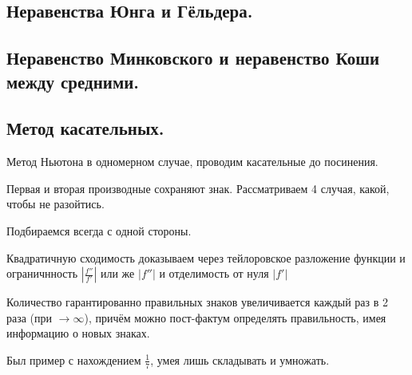 \documentclass[12pt, a4paper]{article}
\begin{document}
\subsection{Неравенства Юнга и Гёльдера.}

\subsection{Неравенство Минковского и неравенство Коши между средними.}

\subsection{Метод касательных.}

Метод Ньютона в одномерном случае, проводим касательные до посинения.

Первая и вторая производные сохраняют знак. 
Рассматриваем 4 случая, какой, чтобы не разойтись.

Подбираемся всегда с одной стороны.

Квадратичную сходимость доказываем через тейлоровское разложение функции 
и ограничнность $\left| \frac{f''}{f'} \right|$ или же $\left| f'' \right|$ и отделимость от нуля $\left| f' \right|$

Количество гарантированно правильных знаков увеличивается каждый раз в 2 раза (при $\rightarrow \infty$), причём можно пост-фактум определять правильность, имея информацию о новых знаках.

Был пример с нахождением $\frac{1}{7}$, умея лишь складывать и умножать.
\end{document}
